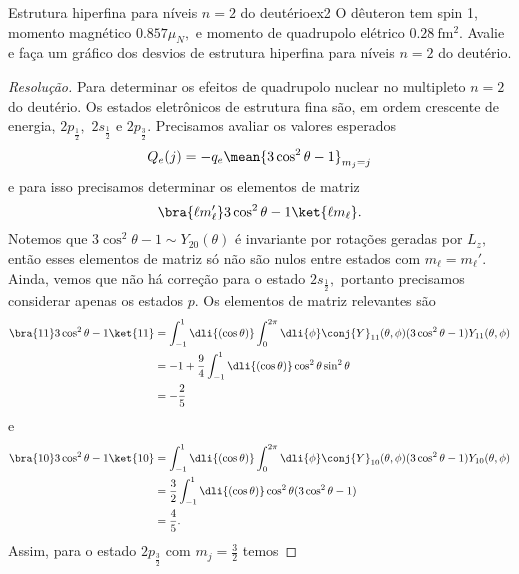 \begin{exercício}{Estrutura hiperfina para níveis \(n = 2\) do deutério}{ex2}
   O dêuteron tem spin 1, momento magnético \(0.857\mu_N,\) e momento de quadrupolo elétrico \(\SI{0.28}{\femto\meter^2}\). Avalie e faça um gráfico dos desvios de estrutura hiperfina para níveis \(n = 2\) do deutério.
\end{exercício}
\begin{proof}[Resolução]
   Para determinar os efeitos de quadrupolo nuclear no multipleto \(n = 2\) do deutério. Os estados eletrônicos de estrutura fina são, em ordem crescente de energia, \(2p_{\frac12},\) \(2s_{\frac12}\) e \(2p_{\frac32}\). Precisamos avaliar os valores esperados
   \begin{equation*}
      Q_e(j) = -q_e\mean{3\cos^2\theta - 1}_{m_j = j}
   \end{equation*}
   e para isso precisamos determinar os elementos de matriz
   \begin{equation*}
      \bra{\ell m_\ell'} 3\cos^2\theta - 1\ket{\ell m_\ell}.
   \end{equation*}
   Notemos que \(3\cos^2\theta - 1 \sim Y_{20}(\theta)\) é invariante por rotações geradas por \(L_z,\) então esses elementos de matriz só não são nulos entre estados com \(m_\ell = m_\ell'.\) Ainda, vemos que não há correção para o estado \(2s_\frac12,\) portanto precisamos considerar apenas os estados \(p.\) Os elementos de matriz relevantes são
   \begin{align*}
      \bra{1 1}3\cos^2\theta - 1\ket{11} &= \int_{-1}^{1} \dli{(\cos\theta)}\int_0^{2\pi} \dli{\phi} \conj{Y}_{11}(\theta,\phi) (3\cos^2\theta - 1) Y_{11}(\theta,\phi)\\
                                         &= -1 + \frac{9}{4}\int_{-1}^{1} \dli{(\cos\theta)} \cos^2\theta \sin^2\theta\\
                                         &= - \frac25
   \end{align*}
   e
   \begin{align*}
      \bra{10}3\cos^2\theta - 1\ket{10} &= \int_{-1}^{1} \dli{(\cos\theta)}\int_0^{2\pi} \dli{\phi} \conj{Y}_{10}(\theta,\phi) (3\cos^2\theta - 1) Y_{10}(\theta,\phi)\\
                                        &= \frac3{2} \int_{-1}^{1} \dli{(\cos\theta)} \cos^2\theta(3\cos^2\theta - 1)\\
                                        &= \frac45.
   \end{align*}
   Assim, para o estado \(2p_{\frac32}\) com \(m_j = \frac32\) temos

\end{proof}
